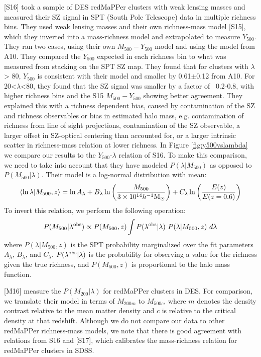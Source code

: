\documentclass[a4paper,fleqn,usenatbib]{mnras}
\begin{document}
\cite{2016arXiv160508770S} [S16] took a sample of DES redMaPPer clusters with weak lensing masses and measured their SZ signal in SPT (South Pole Telescope) data in multiple richness bins. They used weak lensing masses and their own richness-mass model \citep{2015MNRAS.454.2305S} [S15], which they inverted into a mass-richness model and extrapolated to measure $Y_{500}$. They ran two cases, using their own $M_{500} - Y_{500}$ model and using the model from A10. They compared the $Y_{500}$ expected in each richness bin to what was measured from stacking on the SPT SZ map. They found that for clusters with $\lambda$ > 80, $Y_{500}$ is consistent with their model and smaller by 0.61$\pm$0.12 from A10. For 20<$\lambda$<80, they found that the SZ signal was smaller by a factor of ~0.2-0.8, with higher richness bins and the S15 $M_{500} - Y_{500}$ showing better agreement. They explained this with a richness dependent bias, caused by contamination of the SZ and richness observables or bias in estimated halo mass, e.g. contamination of richness from line of sight projections, contamination of the SZ observable, a larger offset in SZ-optical centering than accounted for, or a larger intrinsic scatter in richness-mass relation at lower richness.
In Figure \ref{fig:y500vslambda} we compare our results to the $Y_{500}$-$\lambda$ relation of S16. To make this comparison, we need to take into account that they have modeled $P(\lambda|M_{500})$ as opposed to $P(M_{500}|\lambda)$. Their model is a log-normal distribution with mean:
\begin{equation}
\langle \ln\lambda | M_{500},z\rangle = \ln A_{\lambda} + B_{\lambda} \ln\bigg(\frac{M_{500}}{3 \times 10^{14}h^{-1}\rm M_{\odot}}\bigg) + C_{\lambda}\ln\bigg(\frac{E(z)}{E(z=0.6)}\bigg)
\end{equation}
To invert this relation, we perform the following operation:
\begin{equation}
P(M_{500}|\lambda^{\rm obs}) \propto P(M_{500},z) \int P(\lambda^{\rm obs}|\lambda) \  P(\lambda|M_{500},z) \ d\lambda
\end{equation}
where $P(\lambda|M_{500},z)$ is the SPT probability marginalized over the fit parameters $A_{\lambda}$, $B_{\lambda}$, and $C_{\lambda}$. $P(\lambda^{\rm obs}|\lambda)$ is the probability for observing a value for the richness given the true richness, and $P(M_{500},z)$ is proportional to the halo mass function. 


\cite{2016arXiv161006890M} [M16] measure the $P(M_{200}|\lambda)$ for redMaPPer clusters in DES. For comparison, we translate their model in terms of $M_{200m}$ to $M_{500c}$, where $m$ denotes the density contrast relative to the mean matter density and $c$ is relative to the critical density at that redshift. Although we do not compare our data to other redMaPPer richness-mass models, we note that there is good agreement with relations from S16 and \cite{2017MNRAS.466.3103S} [S17], which calibrates the mass-richness relation for redMaPPer clusters in SDSS.
\end{document}
